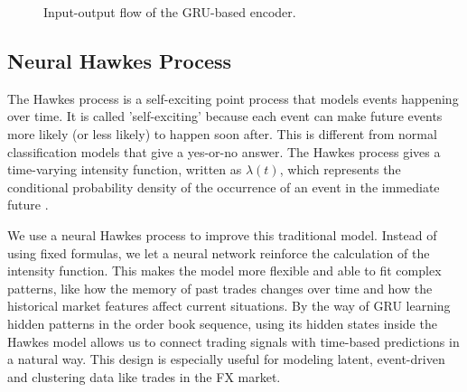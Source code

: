 \begin{figure}[H]
\centering
{}
\caption{Input-output flow of the GRU-based encoder.}
\label{fig:gru-flow}
\end{figure}


\subsection{Neural Hawkes Process}
The Hawkes process is a self-exciting point process that models events happening over time. It is called 'self-exciting' because each event can make future events more likely (or less likely) to happen soon after. This is different from normal classification models that give a yes-or-no answer. The Hawkes process gives a time-varying intensity function, written as $\lambda(t)$, which represents the conditional probability density of the occurrence of an event in the immediate future \citep{bacry2015hawkesprocessesfinance}. 

We use a neural Hawkes process to improve this traditional model. Instead of using fixed formulas, we let a neural network reinforce the calculation of the intensity function. This makes the model more flexible and able to fit complex patterns, like how the memory of past trades changes over time and how the historical market features affect current situations. By the way of GRU learning hidden patterns in the order book sequence, using its hidden states inside the Hawkes model allows us to connect trading signals with time-based predictions in a natural way. This design is especially useful for modeling latent, event-driven and clustering data like trades in the FX market.


